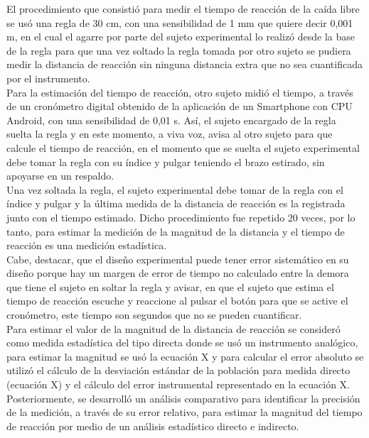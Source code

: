 \documentclass[runningheads]{llncs}
\begin{document}
    El procedimiento que consistió para medir el tiempo de reacción de la caída libre se usó una regla de 30 cm, con una sensibilidad de 1 mm que quiere decir 0,001 m, en el cual el agarre por parte del sujeto experimental lo realizó desde la base de la regla para que una vez soltado la regla tomada por otro sujeto se pudiera medir la distancia de reacción sin ninguna distancia extra que no sea cuantificada por el instrumento. \\
    \linebreak
    Para la estimación del tiempo de reacción, otro sujeto midió el tiempo, a través de un cronómetro digital obtenido de la aplicación de un Smartphone con CPU Android, con una sensibilidad de 0,01 s. Así, el sujeto encargado de la regla suelta la regla y en este momento, a viva voz, avisa al otro sujeto para que calcule el tiempo de reacción, en el momento que se suelta el sujeto experimental debe tomar la regla con su índice y pulgar teniendo el brazo estirado, sin apoyarse en un respaldo. \\
    \linebreak
    Una vez soltada la regla, el sujeto experimental debe tomar de la regla con el índice y pulgar y la última medida de la distancia de reacción es la registrada junto con el tiempo estimado. Dicho procedimiento fue repetido 20 veces, por lo tanto, para estimar la medición de la magnitud de la distancia y el tiempo de reacción es una medición estadística. \\
    \linebreak
    Cabe, destacar, que el diseño experimental puede tener error sistemático en su diseño porque hay un margen de error de tiempo no calculado entre la demora que tiene el sujeto en soltar la regla y avisar, en que el sujeto que estima el tiempo de reacción escuche y reaccione al pulsar el botón para que se active el cronómetro, este tiempo son segundos que no se pueden cuantificar. \\
    \linebreak
    Para estimar el valor de la magnitud de la distancia de reacción se consideró como medida estadística del tipo directa donde se usó un instrumento analógico, para estimar la magnitud se usó la ecuación X y para calcular el error absoluto se utilizó el cálculo de la desviación estándar de la población para medida directo (ecuación X) y el cálculo del error instrumental representado en la ecuación X. \\
    \linebreak
    Posteriormente, se desarrolló un análisis comparativo para identificar la precisión de la medición, a través de su error relativo, para estimar la magnitud del tiempo de reacción por medio de un análisis estadístico directo e indirecto. \\
    \linebreak
\end{document}
